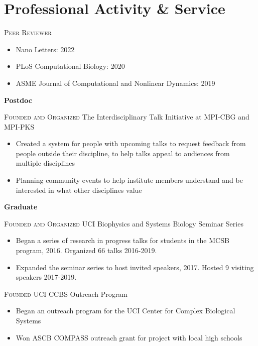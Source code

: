 \documentclass[letterpaper,10pt]{article} %
\begin{document}
\bigskip
\section*{Professional Activity \& Service}
\bigskip

\textsc{Peer Reviewer}
\begin{itemize}
\item Nano Letters: 2022
\item PLoS Computational Biology: 2020
\item ASME Journal of Computational and Nonlinear Dynamics: 2019
\end{itemize}

\bigskip
{\large \textbf{Postdoc}}

\textsc{Founded and Organized} The Interdisciplinary Talk Initiative at MPI-CBG and MPI-PKS
\begin{itemize}
\item Created a system for people with upcoming talks to request feedback from people outside their discipline, to help talks appeal to audiences from multiple disciplines
\item Planning community events to help institute members understand and be interested in what other disciplines value
\end{itemize}

\bigskip
{\large \textbf{Graduate}}

\textsc{Founded and Organized} UCI Biophysics and Systems Biology Seminar Series
\begin{itemize}
\item Began a series of research in progress talks for students in the MCSB program, 2016. Organized 66 talks 2016-2019.
\item Expanded the seminar series to host invited speakers, 2017. Hosted 9 visiting speakers 2017-2019.
\end{itemize}

\textsc{Founded} UCI CCBS Outreach Program
\begin{itemize}
\item Began an outreach program for the UCI Center for Complex Biological Systems
\item Won ASCB COMPASS outreach grant for project with local high schools
\end{itemize}
\end{document}
